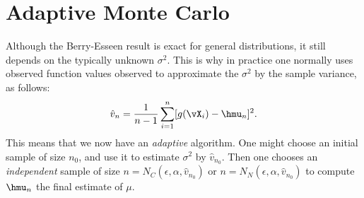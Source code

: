 \documentclass[12pt]{amsart}
\newcommand{\hv}{\hat{v}}
\begin{document}
\section{Adaptive Monte Carlo}
Although the Berry-Esseen result is exact for general distributions, it still depends on the typically unknown $\sigma^2$.  This is why in practice one normally uses observed function values observed to approximate the $\sigma^2$ by the sample variance, as follows:
\begin{equation} \label{samplevar}
\hv_{n} = \frac 1{n-1} \sum_{i=1}^{n} [g(\vX_i)- \hmu_{n}]^2.
\end{equation}
This means that we now have an \emph{adaptive} algorithm.  One might choose an initial sample of size $n_0$, and use it to estimate $\sigma^2$ by $\hv_{n_0}$.  Then one chooses an \emph{independent} sample of size $n=N_{C}(\epsilon,\alpha,\hv_{n_0})$ or $n=N_{N}(\epsilon,\alpha,\hv_{n_0})$ to compute $\hmu_n$ the final estimate of $\mu$.
\end{document}

